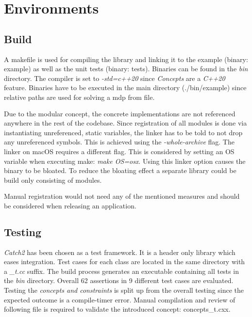 \chapter{Environments}
\section{Build}
\label{build}

A makefile is used for compiling the library and linking it to the example (binary: example) as well as the unit tests (binary: tests). Binaries can be found in the \emph{bin} directory. The compiler is set to \emph{-std=c++20} since \emph{Concepts} are a \emph{C++20} feature. Binaries have to be executed in the main directory (./bin/example) since relative paths are used for solving a mdp from file. 

Due to the modular concept, the concrete implementations are not referenced anywhere in the rest of the codebase. Since registration of all modules is done via instantiating unreferenced, static variables, the linker has to be told to not drop any unreferenced symbols. This is achieved using the \emph{-whole-archive} flag. The linker on macOS requires a different flag. This is considered by setting an OS variable when executing make: \emph{make OS=osx}. Using this linker option causes the binary to be bloated. To reduce the bloating effect a separate library could be build only consisting of modules. 

Manual registration would not need any of the mentioned measures and should be considered when releasing an application. 


\section{Testing}

\emph{Catch2}\autocite{Catch} has been chosen as a test framework. It is a header only library which eases integration. Test cases for each class are located in the same directory with a \emph{\_t.cc} suffix. The build process generates an executable containing all tests in the \emph{bin} directory. Overall 62 assertions in 9 different test cases are evaluated. 
Testing the \emph{concepts and constraints} is split up from the overall testing since the expected outcome is a compile-timer error. Manual compilation and review of following file is required to validate the introduced concept: concepts\_t.cxx.